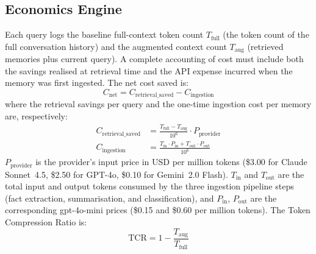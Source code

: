 \documentclass[10pt,twocolumn]{article}
\begin{document}
\subsection{Economics Engine}

\noindent
Each query logs the baseline full-context token count $T_{\text{full}}$ (the
token count of the full conversation history) and the augmented context count
$T_{\text{aug}}$ (retrieved memories plus current query). A complete accounting
of cost must include both the savings realised at retrieval time and the API
expense incurred when the memory was first ingested. The net cost saved is:
\begin{equation}
  C_{\text{net}} = C_{\text{retrieval\_saved}} - C_{\text{ingestion}}
  \label{eq:cost_net}
\end{equation}
where the retrieval savings per query and the one-time ingestion cost per memory
are, respectively:
\begin{align}
  C_{\text{retrieval\_saved}} &= \frac{T_{\text{full}} - T_{\text{aug}}}{10^6}
      \cdot P_{\text{provider}} \label{eq:cost_retrieval} \\
  C_{\text{ingestion}} &= \frac{T_{\text{in}} \cdot P_{\text{in}}
      + T_{\text{out}} \cdot P_{\text{out}}}{10^6} \label{eq:cost_ingestion}
\end{align}
$P_{\text{provider}}$ is the provider's input price in USD per million tokens
(\$3.00 for Claude Sonnet~4.5, \$2.50 for GPT-4o, \$0.10 for Gemini~2.0
Flash). $T_{\text{in}}$ and $T_{\text{out}}$ are the total input and output
tokens consumed by the three ingestion pipeline steps (fact extraction,
summarisation, and classification), and $P_{\text{in}}$, $P_{\text{out}}$ are
the corresponding gpt-4o-mini prices (\$0.15 and \$0.60 per million tokens).
The Token Compression Ratio is:
\begin{equation}
  \text{TCR} = 1 - \frac{T_{\text{aug}}}{T_{\text{full}}}
  \label{eq:tcr}
\end{equation}
\end{document}
